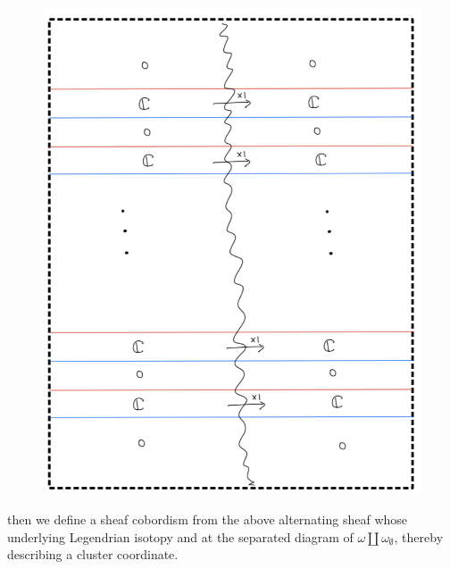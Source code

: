 \begin{figure}[H]
    \centering
    \includegraphics[scale = 0.95]{diagrams/cobord_full/2.png}
    \caption{}
    \label{fig:your-label}
\end{figure}
then we define a sheaf cobordism from the above alternating sheaf whose underlying Legendrian isotopy and at the separated diagram of $\omega \coprod \omega_\emptyset$, thereby describing a cluster coordinate.
\pagebreak
